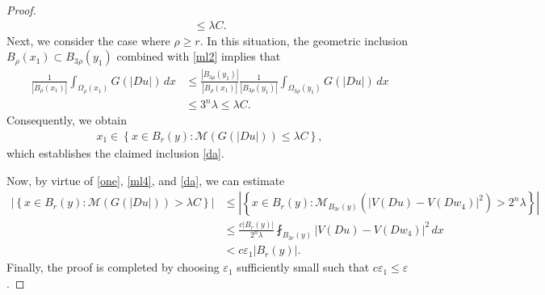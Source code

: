 \documentclass[10pt,a4paper]{article}
\theoremstyle{definition}
\numberwithin{equation}{section}
\begin{document}
\begin{proof}
\begin{align*}
 		\leq \lambda C.
 	\end{align*}
  Next, we consider the case where $\rho\geq r$. In this situation, the geometric inclusion $B_\rho(x_1)\subset B_{3\rho}(y_1)$ combined with \eqref{ml2} implies that
 	\begin{align*}
 		\frac{1}{|B_\rho(x_1)|}
 		\int_{\Omega_\rho(x_1)}G(|Du|)\,dx
 		&\leq
 		\frac{|B_{3\rho}(y_1)|}{|B_\rho(x_1)|}
 		\frac{1}{|B_{3\rho}(y_1)|}
 		\int_{\Omega_{3\rho}(y_1)}G(|Du|)\,dx
 		\nonumber\\
 		&\leq 3^n\lambda
 		\leq \lambda C .
 	\end{align*}
 	 Consequently, we obtain
 	\begin{align*}
 		x_1\in
 		\left\{
 		x\in B_r(y):
 		\mathcal{M}(G(|Du|))\leq \lambda C
 		\right\},
 	\end{align*}
which establishes the claimed inclusion \eqref{da}.
 	
 Now, by virtue of \eqref{one}, \eqref{ml4}, and \eqref{da}, we can estimate
 	\begin{align*}
 		\left|
 		\left\{
 		x\in B_r(y):
 		\mathcal{M}(G(|Du|))>\lambda C
 		\right\}
 		\right|
 		&\leq
 		\left|
 		\left\{
 		x\in B_r(y):
 		\mathcal{M}_{B_{3r}(y)}
 		(|V(Du)-V(Dw_4)|^2)>2^n\lambda
 		\right\}
 		\right|
 		\nonumber\\
 		&\leq
 		\frac{c|B_r(y)|}{2^n\lambda}
 		\fint_{B_{3r}(y)}
 		|V(Du)-V(Dw_4)|^2\,dx
 		\nonumber\\
 		&<
 		c\varepsilon_1|B_r(y)|.
 	\end{align*}
 Finally, the proof is completed by choosing $\varepsilon_1$ sufficiently small such that $c\varepsilon_1\leq \varepsilon$.
 	

\end{proof}
\end{document}

